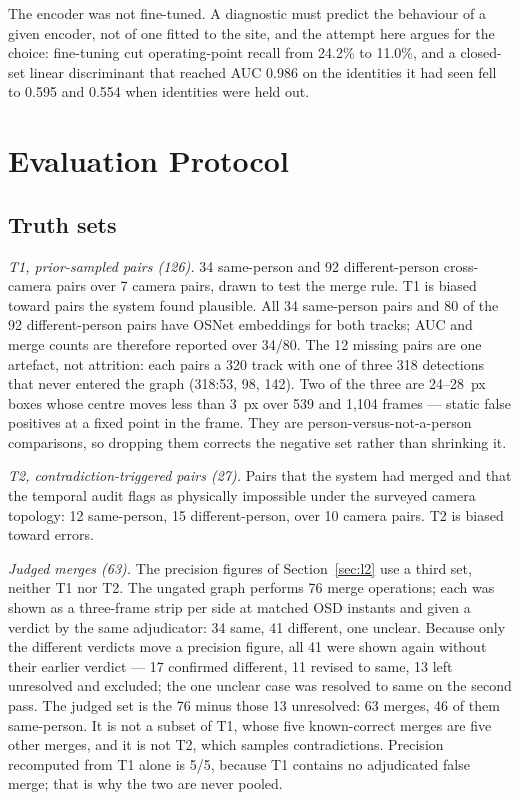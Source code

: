 \documentclass[journal]{IEEEtran}
\begin{document}
The encoder was not fine-tuned. A diagnostic must predict the behaviour of a given encoder, not of one fitted to the site, and the attempt here argues for the choice: fine-tuning cut operating-point recall from 24.2\% to 11.0\%, and a closed-set linear discriminant that reached AUC 0.986 on the identities it had seen fell to 0.595 and 0.554 when identities were held out.

\section{Evaluation Protocol}\label{sec:eval}
\subsection{Truth sets}
\emph{T1, prior-sampled pairs (126).} 34 same-person and 92 different-person cross-camera pairs over 7 camera pairs, drawn to test the merge rule. T1 is biased toward pairs the system found plausible. All 34 same-person pairs and 80 of the 92 different-person pairs have OSNet embeddings for both tracks; AUC and merge counts are therefore reported over 34/80. The 12 missing pairs are one artefact, not attrition: each pairs a 320 track with one of three 318 detections that never entered the graph (318:53, 98, 142). Two of the three are 24--28~px boxes whose centre moves less than 3~px over 539 and 1,104 frames --- static false positives at a fixed point in the frame. They are person-versus-not-a-person comparisons, so dropping them corrects the negative set rather than shrinking it.

\emph{T2, contradiction-triggered pairs (27).} Pairs that the system had merged and that the temporal audit flags as physically impossible under the surveyed camera topology: 12 same-person, 15 different-person, over 10 camera pairs. T2 is biased toward errors.

\emph{Judged merges (63).} The precision figures of Section~\ref{sec:l2} use a third set, neither T1 nor T2. The ungated graph performs 76 merge operations; each was shown as a three-frame strip per side at matched OSD instants and given a verdict by the same adjudicator: 34 same, 41 different, one unclear. Because only the different verdicts move a precision figure, all 41 were shown again without their earlier verdict --- 17 confirmed different, 11 revised to same, 13 left unresolved and excluded; the one unclear case was resolved to same on the second pass. The judged set is the 76 minus those 13 unresolved: 63 merges, 46 of them same-person. It is not a subset of T1, whose five known-correct merges are five other merges, and it is not T2, which samples contradictions. Precision recomputed from T1 alone is 5/5, because T1 contains no adjudicated false merge; that is why the two are never pooled.
\end{document}
